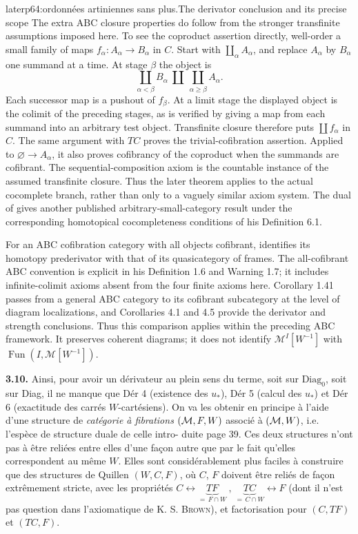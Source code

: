 \begin{dcomment}{later}{p64:ordonnées artiniennes sans plus.}{The derivator conclusion and its precise scope}
The extra ABC closure properties do follow from the stronger transfinite assumptions imposed here. To see the coproduct assertion directly, well-order a small family of maps $f_\alpha:A_\alpha\to B_\alpha$ in $C$. Start with $\coprod_\alpha A_\alpha$, and replace $A_\alpha$ by $B_\alpha$ one summand at a time. At stage $\beta$ the object is
\[
 \coprod_{\alpha<\beta}B_\alpha\ \amalg\
 \coprod_{\alpha\geq\beta}A_\alpha.
\]
Each successor map is a pushout of $f_\beta$. At a limit stage the displayed object is the colimit of the preceding stages, as is verified by giving a map from each summand into an arbitrary test object. Transfinite closure therefore puts $\coprod f_\alpha$ in $C$. The same argument with $TC$ proves the trivial-cofibration assertion. Applied to $\varnothing\to A_\alpha$, it also proves cofibrancy of the coproduct when the summands are cofibrant. The sequential-composition axiom is the countable instance of the assumed transfinite closure. Thus the later theorem applies to the actual cocomplete branch, rather than only to a vaguely similar axiom system. The dual of \citet[Corollary 6.21]{Cisinski2010} gives another published arbitrary-small-category result under the corresponding homotopical cocompleteness conditions of his Definition 6.1.

For an ABC cofibration category with all objects cofibrant, \citet[Theorem 3.33]{Lenz2018} identifies its homotopy prederivator with that of its quasicategory of frames. The all-cofibrant ABC convention is explicit in his Definition 1.6 and Warning 1.7; it includes infinite-colimit axioms absent from the four finite axioms here. Corollary 1.41 passes from a general ABC category to its cofibrant subcategory at the level of diagram localizations, and Corollaries 4.1 and 4.5 provide the derivator and strength conclusions. Thus this comparison applies within the preceding ABC framework. It preserves coherent diagrams; it does not identify $\mathcal M^I[W^{-1}]$ with $\operatorname{Fun}(I,\mathcal M[W^{-1}])$.
\end{dcomment}


\textbf{3.10.} Ainsi, pour avoir un dérivateur au plein sens du terme, soit sur $\mathrm{Diag}_0$, soit sur Diag, il ne manque que Dér 4 (existence des $u_*$), Dér 5 (calcul des $u_*$) et Dér 6 (exactitude des carrés $W$-cartésiens). On va les obtenir en principe à l'aide d'une structure de \textit{catégorie à fibrations} $(\mathcal{M},F,W)$ associé à $(\mathcal{M},W)$, i.e. l'espèce de structure duale de celle intro- %
duite page 39. Ces deux structures n'ont pas à être reliées entre elles d'une façon autre que par le fait qu'elles correspondent au même $W$. Elles sont considérablement plus faciles à construire que des structures de Quillen $(W,C,F)$, où $C$, $F$ doivent être reliés de façon extrêmement stricte, avec les propriétés $C \longleftrightarrow \underbrace{TF}_{=\,F\cap W}\ ,\ \underbrace{TC}_{=\,C\cap W} \longleftrightarrow F$ (dont il n'est pas question dans l'axiomatique de K. S. \textsc{Brown}), et factorisation pour $(C,TF)$ et $(TC,F)$.

